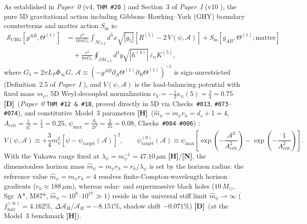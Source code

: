 \documentclass[11pt,a4paper]{article}
\newcommand{\catD}{\textbf{\textcolor{blue!75!black}{[D]}}}
\newcommand{\catH}{\textbf{\textcolor{orange!85!black}{[H]}}}
\newcommand{\catN}{\textbf{\textcolor{teal!75!black}{[N]}}}
\theoremstyle{plain}
\theoremstyle{definition}
\theoremstyle{remark}
\numberwithin{equation}{section}
\begin{document}
As established in \textit{Paper~0} (v4, \texttt{THM~\#20} \cite{jimenez2026_p0}) and Section~3 of \textit{Paper~I} (v10 \cite{jimenez2026a}), the pure 5D gravitational action including Gibbons--Hawking--York (GHY) boundary counterterms \cite{york1972,gibbons1977,parattu2016} and matter action $S_{\text{m}}$ is:
\begin{align}
  \mathcal{S}_{\text{CBG}}\!\left[g^{AB}, \Theta^{(1)}\right] &= \frac{c^3}{16\pi G_5}\int_{\mathcal{M}_{3,2}} d^5x\sqrt{|g_5|}\left[R^{(5)} - 2\,V(\psi, \mathcal{A})\right] + S_{\text{m}}\!\left[g_{AB}, \Theta^{(1)}; \text{matter}\right] \nonumber \\[3pt]
  &\quad + \frac{c^3}{8\pi G_5}\oint_{\partial\mathcal{M}_{3,2}} d^4y\sqrt{|h^{(4)}|}\,\varepsilon_n K^{(5)},
  \label{eq:pure_geometric_action_p2}
\end{align}
where $G_5 = 2\pi L_P\Phi_{\infty}G$, $\mathcal{A} \equiv (-g^{AB}\partial_A\Theta^{(1)}\partial_B\Theta^{(1)})^{-1}$ is sign-unrestricted (Definition~2.5 of \textit{Paper~I} \cite{jimenez2026a}), and $V(\psi,\mathcal{A})$ is the load-balancing potential with fixed mass $m_{\psi}$, 5D Weyl-decoupled normalization $c_V = -\frac{1}{2}\kappa_{\psi}(5) = \frac{3}{4} = 0.75$ \catD\ (\textit{Paper~0} \texttt{THM~\#12 \& \#18}, proved directly in 5D via Checks~\texttt{\#013}, \texttt{\#073}--\texttt{\#074}), and constitutive Model~3 parameters \catH\ ($\hat{m}_{\psi} = m_{\psi}r_h = d_s + 1 = 4$, $A_{\text{crit}} = \frac{1}{d_t^2} = \frac{1}{4} = 0.25$, $\psi_{\max} = \frac{d_t}{D^2} = \frac{2}{25} = 0.08$, Checks~\texttt{\#004}--\texttt{\#006}) \cite{jimenez2026_p0,jimenez2026a}:
\begin{equation}
  V(\psi, \mathcal{A}) \equiv +\frac{3}{4}m_{\psi}^2\left[\psi - \psi_{\text{target}}(\mathcal{A})\right]^2, \qquad \psi_{\text{target}}^{(0)}(\mathcal{A}) \equiv \psi_{\max}\left[\exp\!\left(-\frac{\mathcal{A}^2}{A_{\text{crit}}^2}\right) - \exp\!\left(-\frac{1}{A_{\text{crit}}^2}\right)\right].
  \label{eq:yukawa_potential_p2}
\end{equation}
With the Yukawa range fixed at $\lambda_{\psi} = m_{\psi}^{-1} = 47.10\,\mu\text{m}$ \catH/\catN, the dimensionless horizon mass $\hat{m}_{\psi} = m_{\psi} r_h = r_h/\lambda_{\psi}$ is set by the horizon radius: the reference value $\hat{m}_{\psi} = m_{\psi} r_h = 4$ resolves finite-Compton-wavelength horizon gradients ($r_h \approx 188\,\mu\text{m}$), whereas solar- and supermassive black holes ($10\,M_\odot$, Sgr~A*, M87*, $\hat{m}_{\psi} \sim 10^{8}\text{--}10^{17} \gg 1$) reside in the universal stiff limit $\hat{m}_{\psi} \to \infty$ ($f_{\text{hair}}^{(\infty)} = 4.162\%$, $\Delta\mathcal{A}_H/\mathcal{A}_H = -8.151\%$, shadow shift $-0.071\%$) \catD\ (at the Model~3 benchmark \catH).
\end{document}

